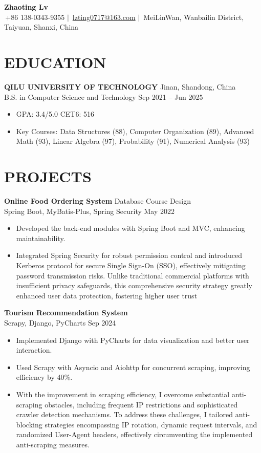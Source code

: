 \documentclass[a4paper,11pt]{article}
\newenvironment{resumeList}{\begin{itemize}[leftmargin=*, label=\textbullet{}, itemsep=2pt]}{\end{itemize}}
\newcommand{\resumeItem}[1]{\item\small{#1}}
\newcommand{\resumeEntry}[4]{%
  \textbf{#1} \hfill #2 \\
  \small #3 \hfill #4
  \vspace{-3pt}
}
\begin{document}
\normalsize  

\begin{center}
    {\bfseries\huge Zhaoting Lv} \\[3pt]
    \small
    \faMobile\,+86 138-0343-9355 \quad $|$ \quad 
    \faAt\,\href{mailto:lvzting0717@163.com}{lzting0717@163.com} \quad $|$ \quad 
    \faMapMarker\,MeiLinWan, Wanbailin District, Taiyuan, Shanxi, China
\end{center}

\section{EDUCATION}
\resumeEntry{QILU UNIVERSITY OF TECHNOLOGY}{Jinan, Shandong, China}
{B.S. in Computer Science and Technology}{Sep 2021 -- Jun 2025}
\begin{resumeList}
    \resumeItem{GPA: 3.4/5.0 \quad CET6: 516} 
    \resumeItem{Key Courses: Data Structures (88), Computer Organization (89), Advanced Math (93), Linear Algebra (97), Probability (91), Numerical Analysis (93)}
\end{resumeList}

\section{PROJECTS}
\resumeEntry{Online Food Ordering System}{Database Course Design}
{Spring Boot, MyBatis-Plus, Spring Security}{May 2022}
\begin{resumeList}
    \resumeItem{Developed the back-end modules with Spring Boot and MVC, enhancing maintainability.}
    \resumeItem{Integrated Spring Security for robust permission control and introduced Kerberos protocol for secure Single Sign-On (SSO), effectively mitigating password transmission risks. Unlike traditional commercial platforms with insufficient privacy safeguards, this comprehensive security strategy greatly enhanced user data protection, fostering higher user trust}
\end{resumeList}

\resumeEntry{Tourism Recommendation System}{}{Scrapy, Django, PyCharts}{Sep 2024}
\begin{resumeList}
    \resumeItem{Implemented Django with PyCharts for data visualization and better user interaction.}
    \resumeItem{Used Scrapy with Asyncio and Aiohttp for concurrent scraping, improving efficiency by 40\%.}
    \resumeItem{With the improvement in scraping efficiency, I overcome substantial anti-scraping obstacles, including frequent IP restrictions and sophisticated crawler detection mechanisms. To address these challenges, I tailored anti-blocking strategies encompassing IP rotation, dynamic request intervals, and randomized User-Agent headers, effectively circumventing the implemented anti-scraping measures.}
\end{resumeList}
\end{document}
